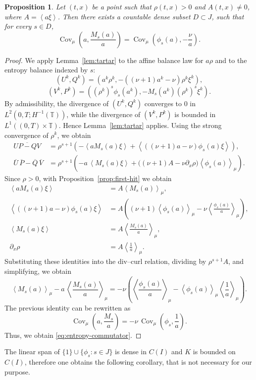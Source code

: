 \documentclass[a4paper,twosided,11pt]{article}
\newcommand{\T}{\mathbb{T}}
\newcommand{\av}[1]{\left\langle #1 \right\rangle}
\newcommand{\avmu}[1]{\left\langle #1 \right\rangle_{\mu}}
\newcommand{\1}{\mathbf{1}}
\DeclareMathOperator*{\Cov}{\operatorname{Cov}}
\theoremstyle{plain}
\newtheorem{proposition}[thm]{Proposition}
\theoremstyle{remark}
\numberwithin{equation}{section}
\begin{document}
\fi

\begin{proposition}
\label{prop:commutator-on-entropy-family}
Let $(t,x)$ be a point such that $\rho(t,x)>0$ and $A(t,x)\neq 0$, where $A=\av{a\xi}$. Then there exists a countable dense subset $D\subset J$, such that for every $s\in D$,
\begin{equation}
\label{eq:entropy-commutator}
\Cov_\mu \left(a,\frac{M_s(a)}{a}\right)
=
\Cov_\mu \left(\phi_s(a),-\frac{\nu}{a}\right).
\end{equation}

\end{proposition}

\begin{proof}
We apply Lemma~\ref{lem:tartar} to the affine balance law for $a\rho$ and to the entropy balance indexed by $s$:
$$
 (U^k,Q^k)=\left(a^k\rho^k,-((\nu+1)a^k-\nu)\rho^k\xi^k\right),
$$
$$
 (V^k,P^k)=\left((\rho^k)^s\phi_s(a^k),-M_s(a^k)(\rho^k)^s\xi^k\right).
$$
By admissibility, the divergence of $(U^k,Q^k)$ converges to $0$ in $L^2(0,T;H^{-1}(\T))$, while the divergence of $(V^k,P^k)$ is bounded in $L^1((0,T)\times\T)$. Hence Lemma~\ref{lem:tartar} applies. Using the strong convergence of $\rho^k$, we obtain
\begin{align*}
 \overline{U P-Q V}
 &=\rho^{s+1}\left(
 -\av{aM_s(a)\xi}
 +\av{((\nu+1)a-\nu)\phi_s(a)\xi}
 \right),\\
 \overline U\, \overline P-\overline Q\, \overline V
 &=\rho^{s+1}\left(
 -a\,\av{M_s(a)\xi}
 +\bigl((\nu+1)A-\nu \partial_x\rho\bigr)\avmu{\phi_s(a)}
 \right).
\end{align*}
Since $\rho>0$, with Proposition~\ref{prop:first-hit} we obtain
\begin{align*}
 \av{aM_s(a)\xi}&=A\avmu{M_s(a)},\\
 \av{((\nu+1)a-\nu)\phi_s(a)\xi}
 &=A\left((\nu+1)\avmu{\phi_s(a)}-\nu\avmu{\frac{\phi_s(a)}{a}}\right),\\
 \av{M_s(a)\xi}&=A\avmu{\frac{M_s(a)}{a}},\\
 \partial_x\rho&=A\avmu{\frac1a}.
\end{align*}
Substituting these identities into the div--curl relation, dividing by $\rho^{s+1}A$, and simplifying, we obtain
\begin{equation*}
 \avmu{M_s(a)}-a\,\avmu{\frac{M_s(a)}{a}}
 =
 -\nu\left(
 \avmu{\frac{\phi_s(a)}{a}}
 -
 \avmu{\phi_s(a)}\avmu{\frac1a}
 \right).
\end{equation*}
The previous identity can be rewritten as
$$
 \Cov_\mu\left(a,\frac{M_s}{a}\right)
 =
 -\nu\,\Cov_\mu\left(\phi_s,\frac1a\right).
$$
Thus, we obtain \eqref{eq:entropy-commutator}.
\end{proof}
\iffalse
The linear span of $\{1\}\cup\{\phi_s:s\in J\}$ is dense in $C(I)$ and $K$ is bounded on $C(I)$, therefore one obtains the following corollary, that is not necessary for our purpose.
\end{document}
